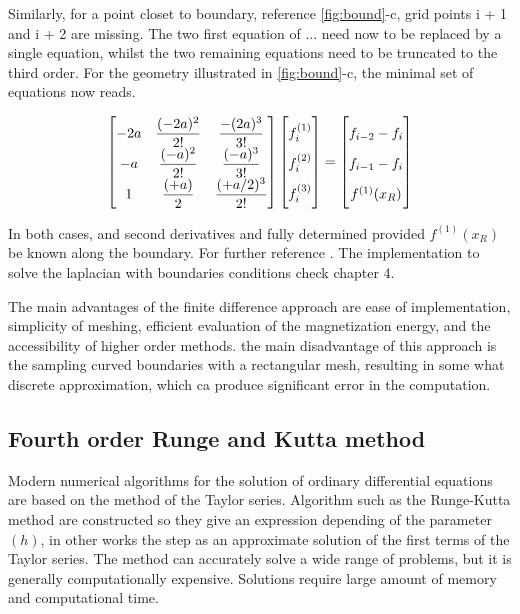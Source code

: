 Similarly, for a point closet to boundary, reference \ref{fig:bound}-c, grid points i + 1 and i + 2 are missing. The two first equation of ... need now to be replaced by a single equation, whilst the two remaining equations need to be truncated to the third order. For the geometry illustrated in \ref{fig:bound}-c, the minimal set of equations now reads.

\begin{align} \label{eq:matrix3}
\begin{bmatrix}
    -2a & \dfrac{(-2a)^2}{2!} & \dfrac{-(2a)^3}{3!}\\
    -a & \dfrac{(-a)^2}{2!} & \dfrac{(-a)^3}{3!}\\
    1 & \dfrac{(+a)}{2} & \dfrac{(+a/2)^3}{2!}
\end{bmatrix}
\begin{bmatrix}
    f_i^{(1)}  \vphantom{ \dfrac{d^4}{d} }\\
    f_i^{(2)}  \vphantom{ \dfrac{d^4}{d} } \\
    f_i^{(3)}  \vphantom{ \dfrac{d^4}{d} }
\end{bmatrix}
=
\begin{bmatrix}
    f_{i-2} - f_{i}    \vphantom{ \dfrac{d^4}{d}} \\
    f_{i-1} - f_{i}    \vphantom{ \dfrac{d^4}{d}} \\
    f^{(1)}(x_R)   \vphantom{ \dfrac{d^4}{d}}
\end{bmatrix}
\end{align}

In both cases, and second derivatives and fully determined provided $f^{(1)}(x_R)$ be known along the boundary. For further reference \cite{methods}. The implementation to solve the laplacian with boundaries conditions check chapter 4.

The main advantages of the finite difference approach are ease of implementation, simplicity of meshing, efficient evaluation of the magnetization energy, and the accessibility of higher order methods. the main disadvantage of this approach is the sampling curved boundaries with a rectangular mesh, resulting in some what discrete  approximation, which ca produce significant error in the computation.

\subsection{Fourth order Runge and Kutta method}

 Modern numerical algorithms for the solution of ordinary differential equations are based on the method of the Taylor series. Algorithm such as the Runge-Kutta method are constructed so they give an expression depending of the parameter $(h)$, in other works the step as an approximate solution of the first terms of the Taylor series. \cite{ufdtd}
The method can accurately solve a wide range of problems, but it is generally computationally expensive. Solutions require large amount of memory and computational time.

